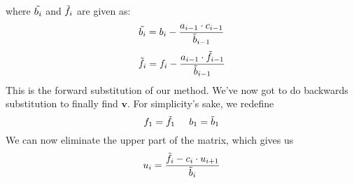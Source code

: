\documentclass{article}
\begin{document}
where $\Tilde{b_i}$ and $\Tilde{f_i}$ are given as:
\begin{equation} \label{1}
    \Tilde{b_i}=b_i-\frac{a_{i-1}\cdot c_{i-1}}{\Tilde{b}_{i-1}}
\end{equation}
\begin{equation}\label{2}
    \Tilde{f_i}=f_i-\frac{a_{i-1}\cdot \Tilde{f}_{i-1}}{\Tilde{b}_{i-1}}
\end{equation}
This is the forward substitution of our method. We've now got to do backwards substitution to finally find $\mathbf{v}$.
For simplicity's sake, we redefine $$f_1 = \Tilde{f_1} \hspace{0.5cm} b_1 = \Tilde{b}_{1}$$
We can now eliminate the upper part of the matrix, which gives us
\begin{equation}\label{3}
    u_i = \frac{\Tilde{f_i}-c_i\cdot u_{i+1}}{\Tilde{b}_{i}}
\end{equation}
\end{document}
